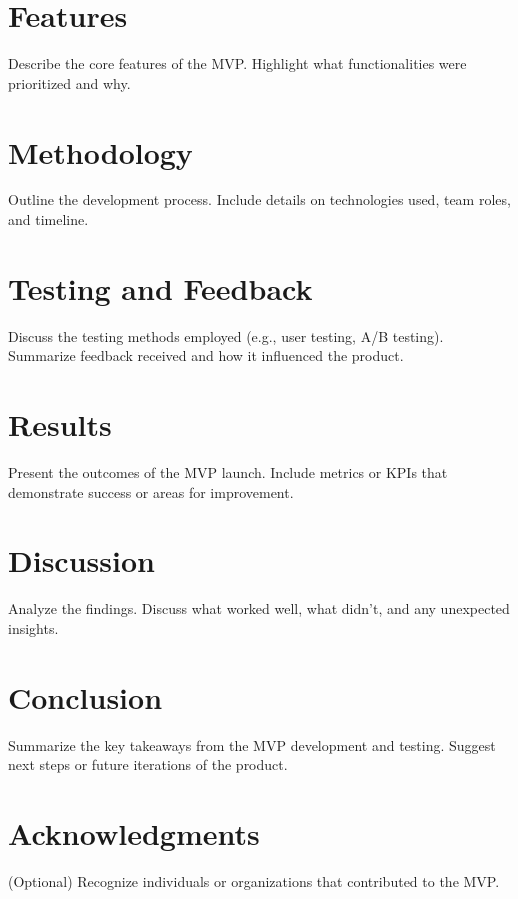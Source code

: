 \documentclass[12pt]{article}
\begin{document}
\section{Features}
Describe the core features of the MVP. Highlight what functionalities were prioritized and why.

\section{Methodology}
Outline the development process. Include details on technologies used, team roles, and timeline.

\section{Testing and Feedback}
Discuss the testing methods employed (e.g., user testing, A/B testing). Summarize feedback received and how it influenced the product.

\section{Results}
Present the outcomes of the MVP launch. Include metrics or KPIs that demonstrate success or areas for improvement.

\section{Discussion}
Analyze the findings. Discuss what worked well, what didn’t, and any unexpected insights.

\section{Conclusion}
Summarize the key takeaways from the MVP development and testing. Suggest next steps or future iterations of the product.

\section*{Acknowledgments}
(Optional) Recognize individuals or organizations that contributed to the MVP.



\end{document}
